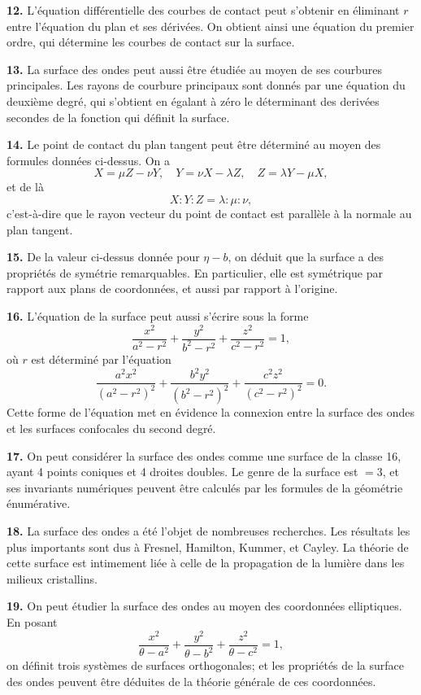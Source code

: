 \documentclass[11pt,a4paper]{book}
\begin{document}
{{{\textbf{12.} L'\'equation diff\'erentielle des courbes de contact peut s'obtenir en
\'eliminant $r$ entre l'\'equation du plan et ses d\'eriv\'ees. On obtient ainsi une
\'equation du premier ordre, qui d\'etermine les courbes de contact sur la surface.

\textbf{13.} La surface des ondes peut aussi \^etre \'etudi\'ee au moyen de ses
courbures principales. Les rayons de courbure principaux sont donn\'es par une
\'equation du deuxi\`eme degr\'e, qui s'obtient en \'egalant \`a z\'ero le d\'eterminant des
deriv\'ees secondes de la fonction qui d\'efinit la surface.

\textbf{14.} Le point de contact du plan tangent peut \^etre d\'etermin\'e au moyen
des formules donn\'ees ci-dessus. On a
\[
X = \mu Z - \nu Y, \quad Y = \nu X - \lambda Z, \quad Z = \lambda Y - \mu X,
\]
et de l\`a
\[
X : Y : Z = \lambda : \mu : \nu,
\]
c'est-\`a-dire que le rayon vecteur du point de contact est parall\`ele \`a la normale au
plan tangent.

\newpage
\textbf{15.} De la valeur ci-dessus donn\'ee pour $\eta - b$, on d\'eduit que la surface
a des propri\'et\'es de sym\'etrie remarquables. En particulier, elle est sym\'etrique
par rapport aux plans de coordonn\'ees, et aussi par rapport \`a l'origine.

\textbf{16.} L'\'equation de la surface peut aussi s'\'ecrire sous la forme
\[
\frac{x^2}{a^2-r^2} + \frac{y^2}{b^2-r^2} + \frac{z^2}{c^2-r^2} = 1,
\]
o\`u $r$ est d\'etermin\'e par l'\'equation
\[
\frac{a^2x^2}{(a^2-r^2)^2} + \frac{b^2y^2}{(b^2-r^2)^2} + \frac{c^2z^2}{(c^2-r^2)^2} = 0.
\]
Cette forme de l'\'equation met en \'evidence la connexion entre la surface des ondes
et les surfaces confocales du second degr\'e.

\textbf{17.} On peut consid\'erer la surface des ondes comme une surface de la
classe 16, ayant 4 points coniques et 4 droites doubles. Le genre de la surface
est $= 3$, et ses invariants num\'eriques peuvent \^etre calcul\'es par les formules de la
g\'eom\'etrie \'enum\'erative.

\textbf{18.} La surface des ondes a \'et\'e l'objet de nombreuses recherches. Les
r\'esultats les plus importants sont dus \`a Fresnel, Hamilton, Kummer, et Cayley.
La th\'eorie de cette surface est intimement li\'ee \`a celle de la propagation de la
lumi\`ere dans les milieux cristallins.

\textbf{19.} On peut \'etudier la surface des ondes au moyen des coordonn\'ees
elliptiques. En posant
\[
\frac{x^2}{\theta-a^2} + \frac{y^2}{\theta-b^2} + \frac{z^2}{\theta-c^2} = 1,
\]
on d\'efinit trois syst\`emes de surfaces orthogonales; et les propri\'et\'es de la surface
des ondes peuvent \^etre d\'eduites de la th\'eorie g\'en\'erale de ces coordonn\'ees.

}}}
\end{document}
